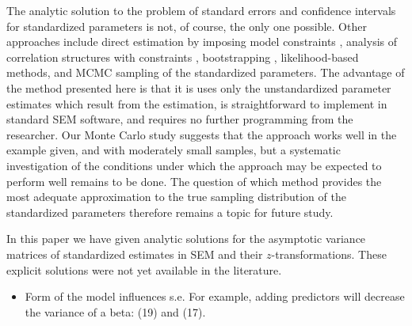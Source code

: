 \documentclass[a4paper,11pt]{article}
\newcommand{\0}{\boldsymbol{0}}
\begin{document}
The analytic solution to the problem of standard errors and confidence intervals for standardized parameters
 is not, of course, the only  one possible. Other approaches include
direct estimation by imposing model constraints \citep{chan2009testing}, analysis of correlation structures with constraints \citep{bentler1983covariance}, bootstrapping , likelihood-based methods, and MCMC sampling of the standardized parameters. The advantage of the method presented here is that it is uses only the unstandardized parameter estimates which result from the estimation, is  straightforward to implement in standard SEM software, and requires no further
programming from the researcher. Our Monte Carlo study suggests that the approach works well in the example given, and with
moderately small samples, but a systematic investigation of the conditions under which the approach may
be expected to perform well remains to be done.
The question of which 
method provides the most adequate approximation to the true sampling distribution of the standardized parameters therefore remains
a topic for future study.

In this paper we have given analytic solutions for the asymptotic variance matrices of standardized estimates in SEM and their 
$z$-transformations. These explicit solutions were not yet available in the literature. 


\begin{itemize}
\item Form of the model influences s.e. For example, adding predictors will decrease the variance of a beta: (19) and (17).
\end{itemize}


\end{document}
